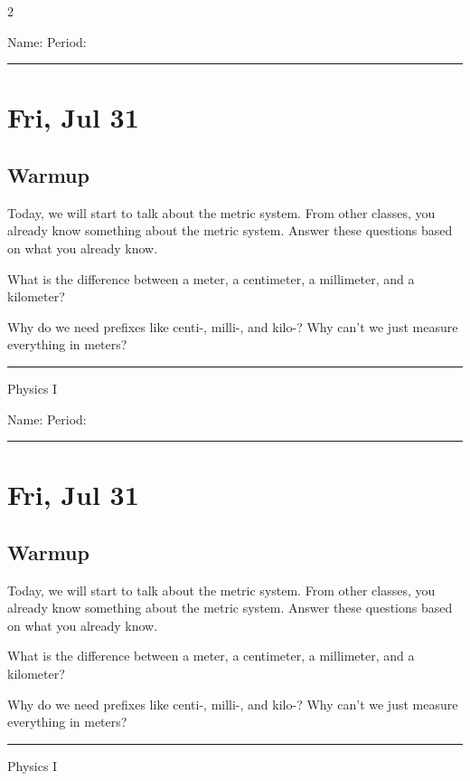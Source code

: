 \documentclass[10pt,landscape]{exam}
\def\todayDate{Fri, Jul 31}
\def\content{

Today, we will start to talk about the metric system.  From other classes, you already know something about the metric system.  Answer these questions based on what you already know.

\begin{questions}
  \question
    What is the difference between a meter, a centimeter, a millimeter, and a kilometer?
    \vs 

  \question
    Why do we need prefixes like centi-, milli-, and kilo-?  Why can't we just measure everything in meters?

\end{questions}
}
\begin{document}
\pagestyle{empty}

\setlength{\columnsep}{0.8in}
\begin{multicols*}{2}

\noindent  
Name: \hfill Period: \hspace{5em}
\vspace{0.5em}
\hrule

\section*{\todayDate}
\subsection*{Warmup}

\content

\vfill
\hrule
\vspace{0.5em}
\hfill {\sc Physics I}

\columnbreak

\noindent  
Name: \hfill Period: \hspace{5em}
\vspace{0.5em}
\hrule

\section*{\todayDate}
\subsection*{Warmup}

\content

\vfill
\hrule
\vspace{0.5em}
\hfill {\sc Physics I}

\end{multicols*}
\end{document}
